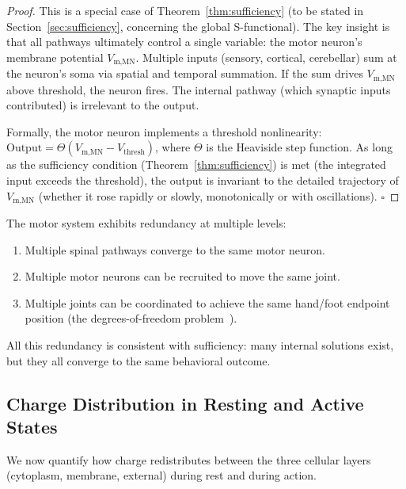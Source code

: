 \begin{proof}
This is a special case of Theorem~\ref{thm:sufficiency} (to be stated in Section~\ref{sec:sufficiency}, concerning the global S-functional). The key insight is that all pathways ultimately control a single variable: the motor neuron's membrane potential $V_{\text{m,MN}}$. Multiple inputs (sensory, cortical, cerebellar) sum at the neuron's soma via spatial and temporal summation. If the sum drives $V_{\text{m,MN}}$ above threshold, the neuron fires. The internal pathway (which synaptic inputs contributed) is irrelevant to the output.

Formally, the motor neuron implements a threshold nonlinearity: $\text{Output} = \Theta(V_{\text{m,MN}} - V_{\text{thresh}})$, where $\Theta$ is the Heaviside step function. As long as the sufficiency condition (Theorem~\ref{thm:sufficiency}) is met (the integrated input exceeds the threshold), the output is invariant to the detailed trajectory of $V_{\text{m,MN}}$ (whether it rose rapidly or slowly, monotonically or with oscillations). $\square$
\end{proof}

\begin{corollary}
\label{cor:motor-redundancy}
The motor system exhibits redundancy at multiple levels:
\begin{enumerate}[label=(\roman*), noitemsep]
\item Multiple spinal pathways converge to the same motor neuron.
\item Multiple motor neurons can be recruited to move the same joint.
\item Multiple joints can be coordinated to achieve the same hand/foot endpoint position (the degrees-of-freedom problem~\cite{Bernstein1967}).
\end{enumerate}
All this redundancy is consistent with sufficiency: many internal solutions exist, but they all converge to the same behavioral outcome.
\end{corollary}

\subsection{Charge Distribution in Resting and Active States}
\label{subsec:charge-states}

We now quantify how charge redistributes between the three cellular layers (cytoplasm, membrane, external) during rest and during action.

